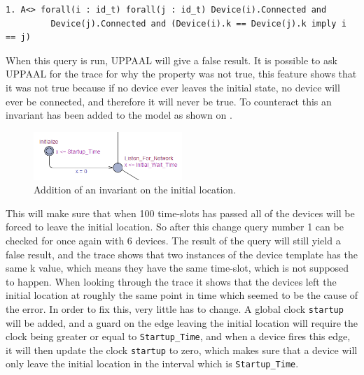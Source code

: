 \noindent\begin{minipage}{\textwidth}
\begin{lstlisting}[style=UPPAAL, title={This query requires that eventually if all devices are connected, then no pair of devices have the same \texttt{k}, unless the pair consists of the same two devices.}]
1. A<> forall(i : id_t) forall(j : id_t) Device(i).Connected and
         Device(j).Connected and (Device(i).k == Device(j).k imply i == j)
\end{lstlisting}
\end{minipage}

When this query is run, UPPAAL will give a false result.
It is possible to ask UPPAAL for the trace for why the property was not true, this feature shows that it was not true because if no device ever leaves the initial state, no device will ever be connected, and therefore it will never be true.
To counteract this an invariant has been added to the model as shown on .

\begin{figure}
  \includegraphics[width=0.5\textwidth]{Figures/Model/InvariantOnStartup.png} 
\caption{Addition of an invariant on the initial location.}
\label{UPPAALInvariant}
\end{figure}

This will make sure that when 100 time-slots has passed all of the devices will be forced to leave the initial location.
So after this change query number 1 can be checked for once again with 6 devices.
The result of the query will still yield a false result, and the trace shows that two instances of the device template has the same k value, which means they have the same time-slot, which is not supposed to happen.
When looking through the trace it shows that the devices left the initial location at roughly the same point in time which seemed to be the cause of the error.
In order to fix this, very little has to change.
A global clock \texttt{startup} will be added, and a guard on the edge leaving the initial location will require the clock being greater or equal to \texttt{Startup\_Time}, and when a device fires this edge, it will then update the clock \texttt{startup} to zero, which makes sure that a device will only leave the initial location in the interval which is \texttt{Startup\_Time}.

